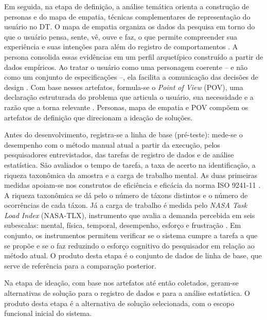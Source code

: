 \documentclass[
	12pt,				%
	oneside,			%
	a4paper,			%
	chapter=TITLE,		%
	section=TITLE,		%
	subsection=TITLE,	%
	subsubsection=TITLE,%
	english,			%
	french,				%
	spanish,			%
	brazilian,				%
	]{abntex2}
\begin{document}
Em seguida, na etapa de definição, a análise temática orienta a construção de personas e do mapa de empatia, técnicas complementares de representação do usuário no DT. O mapa de empatia organiza os dados da pesquisa em torno do que o usuário pensa, sente, vê, ouve e faz, o que permite compreender sua experiência e suas intenções para além do registro de comportamentos \cite{siricharoen_using_2021}. A persona consolida essas evidências em um perfil arquetípico construído a partir de dados empíricos. Ao tratar o usuário como uma personagem coerente -- e não como um conjunto de especificações --, ela facilita a comunicação das decisões de design \cite{siricharoen_using_2021}. Com base nesses artefatos, formula-se o \textit{Point of View} (POV), uma declaração estruturada do problema que articula o usuário, sua necessidade e a razão que a torna relevante \cite{rodriguez_point_2019}. Personas, mapa de empatia e POV compõem os artefatos de definição que direcionam a ideação de soluções.

Antes do desenvolvimento, registra-se a linha de base (pré-teste): mede-se o desempenho com o método manual atual a partir da execução, pelos pesquisadores entrevistados, das tarefas de registro de dados e de análise estatística. São avaliados o tempo de tarefa, a taxa de acerto na identificação, a riqueza taxonômica da amostra e a carga de trabalho mental. As duas primeiras medidas apoiam-se nos construtos de eficiência e eficácia da norma ISO 9241-11 \cite{iso9241_11_2018}. A riqueza taxonômica se dá pelo o número de táxons distintos e o número de ocorrências de cada táxon. Já a carga de trabalho é medida pelo \textit{NASA Task Load Index} (NASA-TLX), instrumento que avalia a demanda percebida em seis subescalas: mental, física, temporal, desempenho, esforço e frustração \cite{hart_development_1988}. Em conjunto, os instrumentos permitem verificar se o sistema cumpre a tarefa a que se propõe e se o faz reduzindo o esforço cognitivo do pesquisador em relação ao método atual. O produto desta etapa é o conjunto de dados de linha de base, que serve de referência para a comparação posterior.

Na etapa de ideação, com base nos artefatos até então coletados, geram-se alternativas de solução para o registro de dados e para a análise estatística. O produto desta etapa é a alternativa de solução selecionada, com o escopo funcional inicial do sistema.
\end{document}
